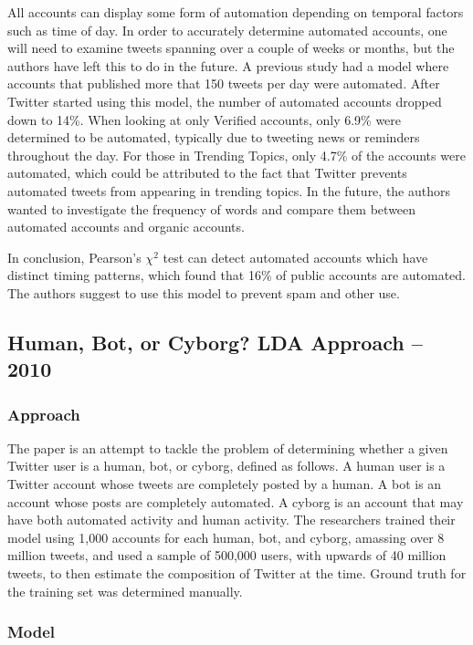 \documentclass[11pt, oneside]{article}   	%
\begin{document}
\quad All accounts can display some form of automation depending on temporal factors such as time of day.
In order to accurately determine automated accounts, one will need to examine tweets spanning over a couple of weeks or months, but the authors have left this to do in the future.
A previous study had a model where accounts that published more that 150 tweets per day were automated.
After Twitter started using this model, the number of automated accounts dropped down to 14\%.
When looking at only Verified accounts, only 6.9\% were determined to be automated, typically due to tweeting news or reminders throughout the day.
For those in Trending Topics, only 4.7\% of the accounts were automated, which could be attributed to the fact that Twitter prevents automated tweets from appearing in trending topics.
In the future, the authors wanted to investigate the frequency of words and compare them between automated accounts and organic accounts.
 
\quad In conclusion, Pearson's $\chi^2$ test can detect automated accounts which have distinct timing patterns, which found that 16\% of public accounts are automated. 
The authors suggest to use this model to prevent spam and other use.

\subsection*{Human, Bot, or Cyborg? LDA Approach -- 2010}

\subsubsection*{Approach}

\quad The paper is an attempt to tackle the problem of determining whether a given Twitter user is a human, bot, or cyborg, defined as follows.
A human user is a Twitter account whose tweets are completely posted by a human.
A bot is an account whose posts are completely automated.
A cyborg is an account that may have both automated activity and human activity.
The researchers trained their model using 1,000 accounts for each human, bot, and cyborg, amassing over 8 million tweets, and used a sample of 500,000 users, with upwards of 40 million tweets, to then estimate the composition of Twitter at the time.
Ground truth for the training set was determined manually.

\subsubsection*{Model}
\end{document}
